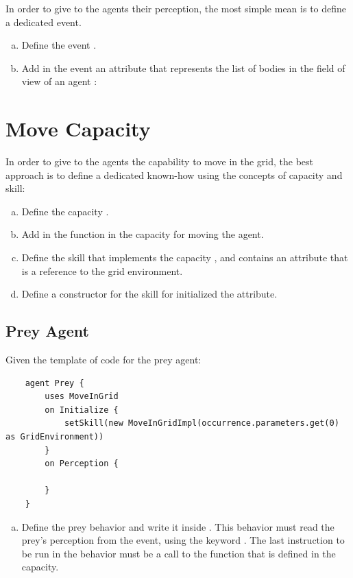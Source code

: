 \documentclass[english,nodocumentinfo,nopubpage]{utbmciadreport}
\begin{document}
In order to give to the agents their perception, the most simple mean is to define a dedicated event.
\begin{enumerate}[a)]
	\item Define the event .
	\item Add in the event an attribute that represents the list of bodies in the field of view of an agent : 
\end{enumerate}

\section{Move Capacity}

In order to give to the agents the capability to move in the grid, the best approach is to define a dedicated known-how using the concepts of capacity and skill:
\begin{enumerate}[a)]
	\item Define the capacity .
	\item Add in the function in the capacity for moving the agent.
	\item Define the skill  that implements the capacity , and contains an attribute that is a reference to the grid environment.
	\item Define a constructor for the  skill for initialized the attribute.
\end{enumerate}

\subsection{Prey Agent}

Given the template of code for the prey agent:
\begin{lstlisting}
	agent Prey {
		uses MoveInGrid
		on Initialize {
			setSkill(new MoveInGridImpl(occurrence.parameters.get(0) as GridEnvironment))
		}
		on Perception {
			
		}
	}
\end{lstlisting}

\begin{enumerate}[a)]
	\item Define the prey behavior and write it inside . This behavior must read the prey's perception from the  event, using the keyword . The last instruction to be run in the behavior must be a call to the function that is defined in the  capacity.
\end{enumerate}
\end{document}
